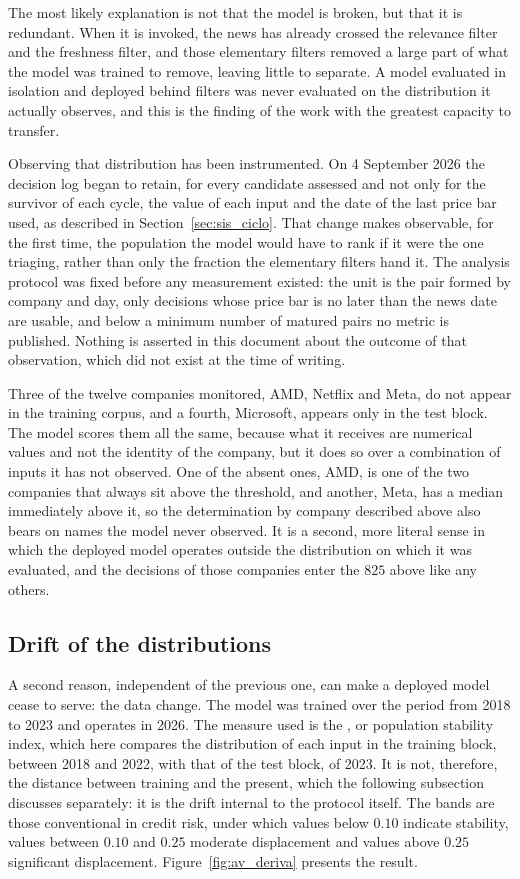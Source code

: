 The most likely explanation is not that the model is broken, but that it is redundant. When it is
invoked, the news has already crossed the relevance filter and the freshness filter, and those
elementary filters removed a large part of what the model was trained to remove, leaving little to
separate. A model evaluated in isolation and deployed behind filters was never evaluated on the
distribution it actually observes, and this is the finding of the work with the greatest capacity
to transfer.

Observing that distribution has been instrumented. On 4 September 2026 the decision log
began to retain, for every candidate assessed and not only for the survivor of each
cycle, the value of each input and the date of the last price bar used, as described in
Section~\ref{sec:sis_ciclo}. That change makes observable, for the first time,
the population the model would have to rank if it were the one triaging, rather than only
the fraction the elementary filters hand it. The analysis protocol was fixed before any
measurement existed: the unit is the pair formed by company and day, only decisions whose
price bar is no later than the news date are usable, and below a minimum number of
matured pairs no metric is published. Nothing is asserted in this document about the
outcome of that observation, which did not exist at the time of writing.

Three of the twelve companies monitored, AMD, Netflix and Meta, do not appear in the training
corpus, and a fourth, Microsoft, appears only in the test block. The model scores them all the
same, because what it receives are numerical values and not the identity of the company, but it
does so over a combination of inputs it has not observed. One of the absent ones, AMD, is one of the
two companies that always sit above the threshold, and another, Meta, has a median immediately above
it, so the determination by company described above also bears on
names the model never observed. It is a second, more literal sense in
which the deployed model operates outside the distribution on which it was evaluated, and the
decisions of those companies enter the $825$ above like any others.

\subsection{Drift of the distributions}

A second reason, independent of the previous one, can make a deployed model cease to serve: the
data change. The model was trained over the period from 2018 to 2023 and operates in 2026. The
measure used is the , or population stability index, which here compares the
distribution of each input in the training
block, between 2018 and 2022, with that of the test block, of 2023. It is not, therefore, the
distance between training and the present, which the following subsection discusses separately: it
is the drift internal to the protocol itself. The bands are those conventional in credit risk, under
which values below $0.10$ indicate stability, values between $0.10$ and $0.25$ moderate
displacement and values above $0.25$ significant displacement. Figure~\ref{fig:av_deriva} presents
the result.

